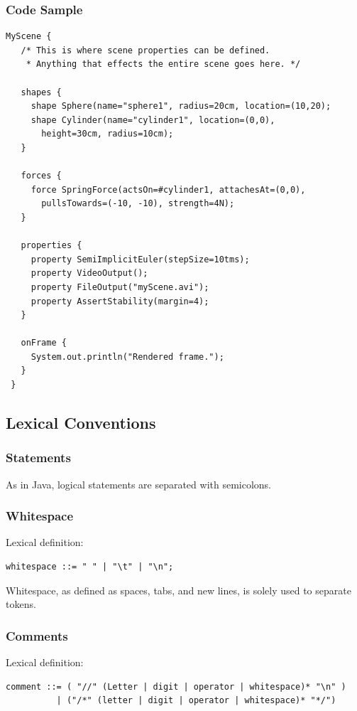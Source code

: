 \subsubsection{Code Sample}

\begin{verbatim}
MyScene {
   /* This is where scene properties can be defined.
    * Anything that effects the entire scene goes here. */
   
   shapes {
     shape Sphere(name="sphere1", radius=20cm, location=(10,20);
     shape Cylinder(name="cylinder1", location=(0,0), 
       height=30cm, radius=10cm);
   }
   
   forces {
     force SpringForce(actsOn=#cylinder1, attachesAt=(0,0), 
       pullsTowards=(-10, -10), strength=4N);
   }
   
   properties {
     property SemiImplicitEuler(stepSize=10tms);
     property VideoOutput();
     property FileOutput("myScene.avi");
     property AssertStability(margin=4);
   }

   onFrame {
     System.out.println("Rendered frame.");
   }
 }
\end{verbatim}

\subsection{Lexical Conventions}
 
\subsubsection{Statements}
As in Java, logical statements are separated with semicolons.
 
\subsubsection{Whitespace}
Lexical definition:

\begin{verbatim}
whitespace ::= " " | "\t" | "\n";
\end{verbatim}

Whitespace, as defined as spaces, tabs, and new lines, is solely used
to separate tokens.
 
\subsubsection{Comments}
Lexical definition:

\begin{verbatim}
comment ::= ( "//" (Letter | digit | operator | whitespace)* "\n" ) 
          | ("/*" (letter | digit | operator | whitespace)* "*/")
\end{verbatim}

